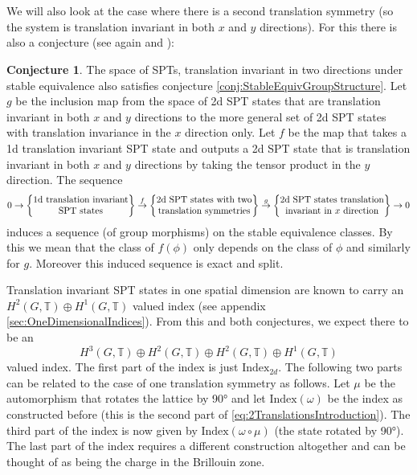 \documentclass[12pt,a4paper,twoside]{article}
\let\originalleft\left
\let\originalright\right
\renewcommand{\left}{\mathopen{}\mathclose\bgroup\originalleft}
\renewcommand{\right}{\aftergroup\egroup\originalright}
\newcommand{\TT}{\mathbb T}
\theoremstyle{definition}
\newtheorem{conjecture}[theorem]{Conjecture}
\numberwithin{equation}{section}
\begin{document}
\\\\
We will also look at the case where there is a second translation symmetry (so the system is translation invariant in both $x$ and $y$ directions). For this there is also a conjecture (see again \cite{xiong2019classification} and \cite{Chen_2013}):
\begin{conjecture}\label{conj2}
	The space of SPTs, translation invariant in two directions under stable equivalence also satisfies conjecture \ref{conj:StableEquivGroupStructure}. Let $g$ be the inclusion map from the space of 2d SPT states that are translation invariant in both $x$ and $y$ directions to the more general set of 2d SPT states with translation invariance in the $x$ direction only. Let $f$ be the map that takes a 1d translation invariant SPT state and outputs a 2d SPT state that is translation invariant in both $x$ and $y$ directions by taking the tensor product in the $y$ direction. The sequence
	\begin{equation}
		0\rightarrow\left\{\begin{matrix}\text{1d translation invariant}\\ \text{SPT states}\end{matrix}\right\}\stackrel{f}{\rightarrow}\left\{\begin{matrix}\text{2d SPT states with two}\\ \text{translation symmetries}\end{matrix}\right\}\stackrel{g}{\rightarrow}\left\{\begin{matrix}\text{2d SPT states translation}\\ \text{invariant in $x$ direction}\end{matrix}\right\}\rightarrow 0
	\end{equation}
	induces a sequence (of group morphisms) on the stable equivalence classes. By this we mean that the class of $f(\phi)$ only depends on the class of $\phi$ and similarly for $g$. Moreover this induced sequence is exact and split.
\end{conjecture}
Translation invariant SPT states in one spatial dimension are known to carry an $H^2(G,\TT)\oplus H^1(G,\TT)$ valued index (see appendix \ref{sec:OneDimensionalIndices}). From this and both conjectures, we expect there to be an
\begin{equation}\label{eq:2TranslationsIntroduction}
	H^3(G,\TT)\oplus H^2(G,\TT)\oplus H^2(G,\TT)\oplus H^1(G,\TT)
\end{equation}
valued index. The first part of the index is just $\textrm{Index}_{2d}$. The following two parts can be related to the case of one translation symmetry as follows. Let $\mu$ be the automorphism that rotates the lattice by 90° and let $\textrm{Index}(\omega)$ be the index as constructed before (this is the second part of \ref{eq:2TranslationsIntroduction}). The third part of the index is now given by $\textrm{Index}(\omega\circ\mu)$ (the state rotated by 90°). The last part of the index requires a different construction altogether and can be thought of as being the charge in the Brillouin zone.
\end{document}
